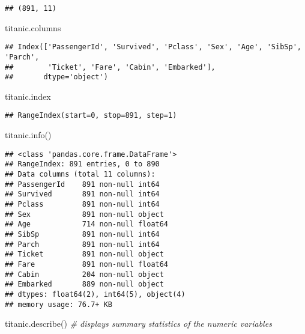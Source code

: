 \documentclass[
]{book}
\newenvironment{Shaded}{\begin{snugshade}}{\end{snugshade}}
\newcommand{\CommentTok}[1]{\textcolor[rgb]{0.56,0.35,0.01}{\textit{#1}}}
\newcommand{\NormalTok}[1]{#1}
\begin{document}
\begin{verbatim}
## (891, 11)
\end{verbatim}

\begin{Shaded}
\begin{Highlighting}[]
\NormalTok{titanic.columns}
\end{Highlighting}
\end{Shaded}

\begin{verbatim}
## Index(['PassengerId', 'Survived', 'Pclass', 'Sex', 'Age', 'SibSp', 'Parch',
##        'Ticket', 'Fare', 'Cabin', 'Embarked'],
##       dtype='object')
\end{verbatim}

\begin{Shaded}
\begin{Highlighting}[]
\NormalTok{titanic.index}
\end{Highlighting}
\end{Shaded}

\begin{verbatim}
## RangeIndex(start=0, stop=891, step=1)
\end{verbatim}

\begin{Shaded}
\begin{Highlighting}[]
\NormalTok{titanic.info()}
\end{Highlighting}
\end{Shaded}

\begin{verbatim}
## <class 'pandas.core.frame.DataFrame'>
## RangeIndex: 891 entries, 0 to 890
## Data columns (total 11 columns):
## PassengerId    891 non-null int64
## Survived       891 non-null int64
## Pclass         891 non-null int64
## Sex            891 non-null object
## Age            714 non-null float64
## SibSp          891 non-null int64
## Parch          891 non-null int64
## Ticket         891 non-null object
## Fare           891 non-null float64
## Cabin          204 non-null object
## Embarked       889 non-null object
## dtypes: float64(2), int64(5), object(4)
## memory usage: 76.7+ KB
\end{verbatim}

\begin{Shaded}
\begin{Highlighting}[]
\NormalTok{titanic.describe() }\CommentTok{\# displays summary statistics of the numeric variables}
\end{Highlighting}
\end{Shaded}
\end{document}
